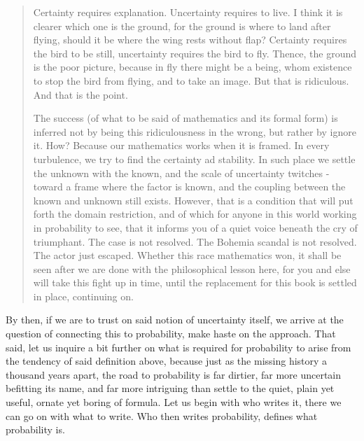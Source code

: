 \begin{quote}
    Certainty requires explanation. Uncertainty requires to live. I think it is clearer which one is the ground, for the ground is where to land after flying, should it be where the wing rests without flap? Certainty requires the bird to be still, uncertainty requires the bird to fly. Thence, the ground is the poor picture, because in fly there might be a being, whom existence to stop the bird from flying, and to take an image. But that is ridiculous. And that is the point.

    The success (of what to be said of mathematics and its formal form) is inferred not by being this ridiculousness in the wrong, but rather by ignore it. How? Because our mathematics works when it is framed. In every turbulence, we try to find the certainty ad stability. In such place we settle the unknown with the known, and the scale of uncertainty twitches - toward a frame where the factor is known, and the coupling between the known and unknown still exists. However, that is a condition that will put forth the domain restriction, and of which for anyone in this world working in probability to see, that it informs you of a quiet voice beneath the cry of triumphant. The case is not resolved. The Bohemia scandal is not resolved. The actor just escaped. Whether this race mathematics won, it shall be seen after we are done with the philosophical lesson here, for you and else will take this fight up in time, until the replacement for this book is settled in place, continuing on.
\end{quote}

By then, if we are to trust on said notion of uncertainty itself, we arrive at the question of connecting this to probability, make haste on the approach. That said, let us inquire a bit further on what is required for probability to arise from the tendency of said definition above, because just as the missing history a thousand years apart, the road to probability is far dirtier, far more uncertain befitting its name, and far more intriguing than settle to the quiet, plain yet useful, ornate yet boring of formula. Let us begin with who writes it, there we can go on with what to write. Who then writes probability, defines what probability is. 

